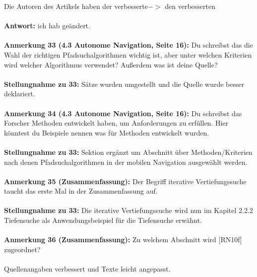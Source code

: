 \documentclass[a4paper,12pt]{book}
\begin{document}
\glqq Die Autoren des Artikels haben der verbesserte\grqq $->$ den verbesserten
 \\  \\
\textbf{Antwort:} ich hab geändert.
\\ \\
\textbf{Anmerkung 33 (4.3 Autonome Navigation, Seite 16):}
Du schreibst das die Wahl der richtigen Pfadsuchalgorithmen wichtig ist, aber unter welchen Kriterien wird welcher Algorithmus verwendet? 
Außerdem was ist deine Quelle?
\\ \\
\textbf{Stellungnahme zu 33:}
Sätze wurden umgestellt und die Quelle wurde besser deklariert.
\\ \\
\textbf{Anmerkung 34 (4.3 Autonome Navigation, Seite 16):}
Du schreibst das Forscher Methoden entwickelt haben, um Anforderungen zu erfüllen. Hier könntest du Beispiele nennen was für Methoden entwickelt wurden. 
\\ \\
\textbf{Stellungnahme zu 33:}
Sektion ergänzt um Abschnitt über Methoden/Kriterien nach denen Pfadsuchalgorithmen in der mobilen Navigation ausgewählt werden.
\\ \\
\textbf{Anmerkung 35 (Zusammenfassung):}
Der Begriff iterative Vertiefungssuche taucht das erste Mal in der Zusammenfassung auf. 
\\ \\
\textbf{Stellungnahme zu 33:}
Die iterative Vertiefungssuche wird nun im Kapitel 2.2.2 Tiefensuche als Anwendungsbeispiel für die Tiefensuche erwähnt.
\\ \\
\textbf{Anmerkung 36 (Zusammenfassung):}
Zu welchem Abschnitt wird [RN10f] zugeordnet?
\\ \\
Quellenangaben verbessert und Texte leicht angepasst.
\\ \\
\end{document}
